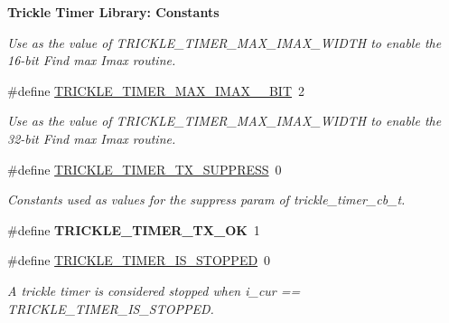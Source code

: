 \begin{Indent}{\bf Trickle Timer Library\+: Constants}
\begin{DoxyCompactItemize}
\begin{DoxyCompactList}\small\item\em Use as the value of T\+R\+I\+C\+K\+L\+E\+\_\+\+T\+I\+M\+E\+R\+\_\+\+M\+A\+X\+\_\+\+I\+M\+A\+X\+\_\+\+W\+I\+D\+T\+H to enable the 16-\/bit \textquotesingle{}Find max Imax\textquotesingle{} routine. \end{DoxyCompactList}\item 
\hypertarget{group__trickle-timer_gaaaa2a3bec490540d904a0b4a44c6251d}{}\#define \hyperlink{group__trickle-timer_gaaaa2a3bec490540d904a0b4a44c6251d}{T\+R\+I\+C\+K\+L\+E\+\_\+\+T\+I\+M\+E\+R\+\_\+\+M\+A\+X\+\_\+\+I\+M\+A\+X\+\_\+\_\+\+B\+I\+T}~2\label{group__trickle-timer_gaaaa2a3bec490540d904a0b4a44c6251d}

\begin{DoxyCompactList}\small\item\em Use as the value of T\+R\+I\+C\+K\+L\+E\+\_\+\+T\+I\+M\+E\+R\+\_\+\+M\+A\+X\+\_\+\+I\+M\+A\+X\+\_\+\+W\+I\+D\+T\+H to enable the 32-\/bit \textquotesingle{}Find max Imax\textquotesingle{} routine. \end{DoxyCompactList}\item 
\hypertarget{group__trickle-timer_ga45ed26596d700d8c9111751b243eae7b}{}\#define \hyperlink{group__trickle-timer_ga45ed26596d700d8c9111751b243eae7b}{T\+R\+I\+C\+K\+L\+E\+\_\+\+T\+I\+M\+E\+R\+\_\+\+T\+X\+\_\+\+S\+U\+P\+P\+R\+E\+S\+S}~0\label{group__trickle-timer_ga45ed26596d700d8c9111751b243eae7b}

\begin{DoxyCompactList}\small\item\em Constants used as values for the {\itshape suppress} param of trickle\+\_\+timer\+\_\+cb\+\_\+t. \end{DoxyCompactList}\item 
\hypertarget{group__trickle-timer_gae692f25bfc1a2915a28389db0fb2a752}{}\#define {\bfseries T\+R\+I\+C\+K\+L\+E\+\_\+\+T\+I\+M\+E\+R\+\_\+\+T\+X\+\_\+\+O\+K}~1\label{group__trickle-timer_gae692f25bfc1a2915a28389db0fb2a752}

\item 
\#define \hyperlink{group__trickle-timer_ga46a9d1ac6e07dc96cfd6224b873333ca}{T\+R\+I\+C\+K\+L\+E\+\_\+\+T\+I\+M\+E\+R\+\_\+\+I\+S\+\_\+\+S\+T\+O\+P\+P\+E\+D}~0
\begin{DoxyCompactList}\small\item\em A trickle timer is considered \textquotesingle{}stopped\textquotesingle{} when i\+\_\+cur == T\+R\+I\+C\+K\+L\+E\+\_\+\+T\+I\+M\+E\+R\+\_\+\+I\+S\+\_\+\+S\+T\+O\+P\+P\+E\+D. \end{DoxyCompactList}\end{DoxyCompactItemize}
\end{Indent}
